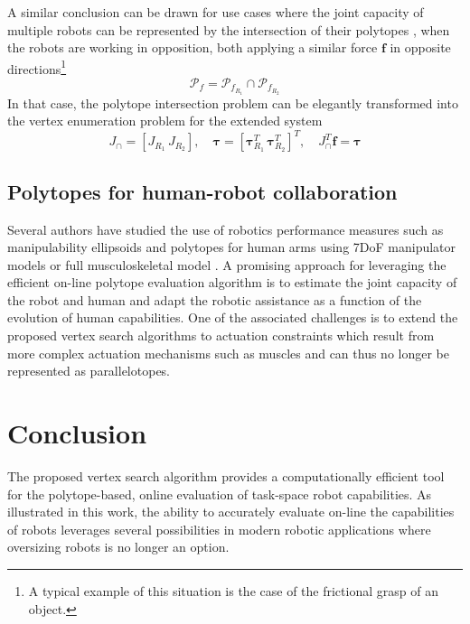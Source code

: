 A similar conclusion can be drawn for use cases where the joint capacity of multiple robots can be represented by the intersection of their polytopes \cite{long2020constrained},  when the robots are working in opposition, both applying a similar force $\bm{f}$ in opposite directions\footnote{A typical example of this situation is the case of the frictional grasp of an object.}
\begin{equation}
\mathcal{P}_f = \mathcal{P}_{f_{R_1}}  \cap \mathcal{P}_{f_{R_2}}     
\end{equation}
In that case, the polytope intersection problem can be elegantly transformed into the vertex enumeration problem for the extended system
\begin{equation}
J_\cap = [J_{R_1}\, J_{R_2}],\quad \bm{\tau} = \left[\bm{\tau}_{R_1}^T\, \bm{\tau}_{R_2}^T\right]^T, \quad J_\cap^T\bm{f} = \bm{\tau}
\end{equation}

\subsection{Polytopes for human-robot collaboration}
Several authors have studied the use of robotics performance measures such as manipulability ellipsoids and polytopes for human arms using 7DoF manipulator models \cite{rezzoug_application_2012}\cite{lazinica_higher_2010}\cite{carmichael_estimating_2013}\cite{carmichael_towards_2011} or full musculoskeletal model \cite{hernandez_toward_2015}. A promising approach for leveraging the efficient on-line polytope evaluation algorithm is to estimate the joint capacity of the robot and human and adapt the robotic assistance as a function of the evolution of human capabilities.  One of the associated challenges is to extend the proposed vertex search algorithms to actuation constraints which result from more complex actuation mechanisms such as muscles and can thus no longer be represented as parallelotopes.

\section{Conclusion}

The proposed vertex search algorithm provides a computationally efficient tool for the polytope-based, online evaluation of task-space robot capabilities. As illustrated in this work, the ability to accurately evaluate on-line the capabilities of robots leverages several possibilities in modern robotic applications where oversizing robots is no longer an option.




